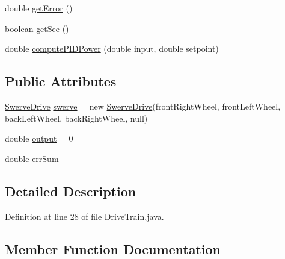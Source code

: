 \begin{DoxyCompactItemize}
\item 
double \mbox{\hyperlink{classorg_1_1usfirst_1_1frc3707_1_1_creedence_1_1subsystems_1_1_drive_train_a0d86aea6052e1c19c0a7c3c9f263573b}{get\+Error}} ()
\item 
boolean \mbox{\hyperlink{classorg_1_1usfirst_1_1frc3707_1_1_creedence_1_1subsystems_1_1_drive_train_ae6525c4274d4545ce25525643e3cfd89}{get\+See}} ()
\item 
double \mbox{\hyperlink{classorg_1_1usfirst_1_1frc3707_1_1_creedence_1_1subsystems_1_1_drive_train_afb1ac8b5266985f7fb0232198da4d006}{compute\+P\+I\+D\+Power}} (double input, double setpoint)
\end{DoxyCompactItemize}
\subsection*{Public Attributes}
\begin{DoxyCompactItemize}
\item 
\mbox{\hyperlink{classorg_1_1usfirst_1_1frc3707_1_1_creedence_1_1swerve_1_1_swerve_drive}{Swerve\+Drive}} \mbox{\hyperlink{classorg_1_1usfirst_1_1frc3707_1_1_creedence_1_1subsystems_1_1_drive_train_a7954d8aff6e4d46fc583b9db0d82b896}{swerve}} = new \mbox{\hyperlink{classorg_1_1usfirst_1_1frc3707_1_1_creedence_1_1swerve_1_1_swerve_drive}{Swerve\+Drive}}(front\+Right\+Wheel, front\+Left\+Wheel, back\+Left\+Wheel, back\+Right\+Wheel, null)
\item 
double \mbox{\hyperlink{classorg_1_1usfirst_1_1frc3707_1_1_creedence_1_1subsystems_1_1_drive_train_a7d940c415d3810efea233a1c4d8419d4}{output}} = 0
\item 
double \mbox{\hyperlink{classorg_1_1usfirst_1_1frc3707_1_1_creedence_1_1subsystems_1_1_drive_train_ab81cea65106ffd97ccd189b5d1f89d8c}{err\+Sum}}
\end{DoxyCompactItemize}


\subsection{Detailed Description}


Definition at line 28 of file Drive\+Train.\+java.



\subsection{Member Function Documentation}
\mbox{\label{classorg_1_1usfirst_1_1frc3707_1_1_creedence_1_1subsystems_1_1_drive_train_afb1ac8b5266985f7fb0232198da4d006}} 
